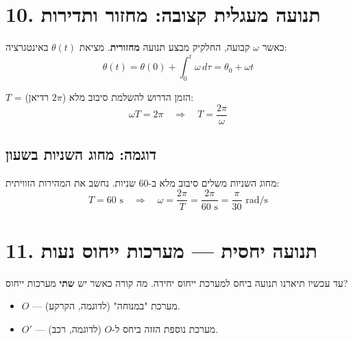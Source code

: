 \documentclass[12pt, a4paper]{article}
\newcommand{\hvec}[1]{\overrightarrow{#1}}
\begin{document}
\section*{10. תנועה מעגלית קצובה: מחזור ותדירות}

כאשר \textenglish{$\omega$} קבועה, החלקיק מבצע תנועה \textbf{מחזורית}. מציאת \textenglish{$\theta(t)$} באינטגרציה:
\[
  \theta(t) = \theta(0) + \int_0^t \omega\,d\tau = \theta_0 + \omega t
\]

\begin{tcolorbox}[defbox, title={מחזור (\textenglish{Period})}]
\textenglish{$T$} = הזמן הדרוש להשלמת סיבוב מלא (\textenglish{$2\pi$} רדיאן):
\[
  \omega T = 2\pi
  \quad\Longrightarrow\quad
  T = \frac{2\pi}{\omega}
\]
\end{tcolorbox}

\subsection*{דוגמה: מחוג השניות בשעון}

מחוג השניות משלים סיבוב מלא ב-60 שניות. נחשב את המהירות הזוויתית:
\[
  T = 60\text{ s}
  \quad\Longrightarrow\quad
  \omega = \frac{2\pi}{T} = \frac{2\pi}{60\text{ s}} = \frac{\pi}{30}\text{ rad/s}
\]

\section*{11. תנועה יחסית --- מערכות ייחוס נעות}

עד עכשיו תיארנו תנועה ביחס למערכת ייחוס יחידה. מה קורה כאשר יש \textbf{שתי} מערכות ייחוס?

\begin{itemize}
  \item \textenglish{$O$} --- מערכת "במנוחה" (לדוגמה, הקרקע).
  \item \textenglish{$O'$} --- מערכת נוספת הזזה ביחס ל-\textenglish{$O$} (לדוגמה, רכב).
\end{itemize}

\begin{center}
\end{center}
\end{document}
